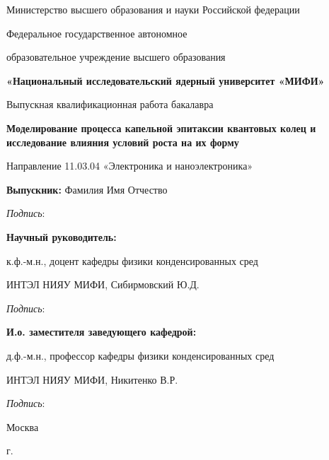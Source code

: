 \begin{titlepage}
\begin{center}
{Министерство высшего образования и науки Российской федерации}

{Федеральное государственное автономное}

{образовательное учреждение высшего образования}

{\textbf{«Национальный исследовательский ядерный университет «МИФИ»}}

\vspace{20mm}

Выпускная квалификационная работа бакалавра

\textbf{\large Моделирование процесса капельной эпитаксии квантовых колец и исследование влияния условий роста на их форму}

\vspace{10mm}
Направление 11.03.04 «Электроника и наноэлектроника»\\

\vspace{10mm}

\begin{flushleft}
\textbf{Выпускник:} Фамилия Имя Отчество

\hspace{10cm} \textit{Подпись}: \space \hrulefill

\textbf{Научный руководитель:} 

к.ф.-м.н., доцент кафедры физики конденсированных сред

ИНТЭЛ НИЯУ МИФИ, Сибирмовский Ю.Д.

\hspace{10cm} \textit{Подпись}: \space \hrulefill

\textbf{И.о. заместителя заведующего кафедрой:} 

д.ф.-м.н., профессор кафедры физики конденсированных сред 

ИНТЭЛ НИЯУ МИФИ, Никитенко В.Р.

\hspace{10cm} \textit{Подпись}: \space \hrulefill \space
\end{flushleft}

\vfill

{Москва}
\par{\the\year{} г.}
\end{center}
\end{titlepage}